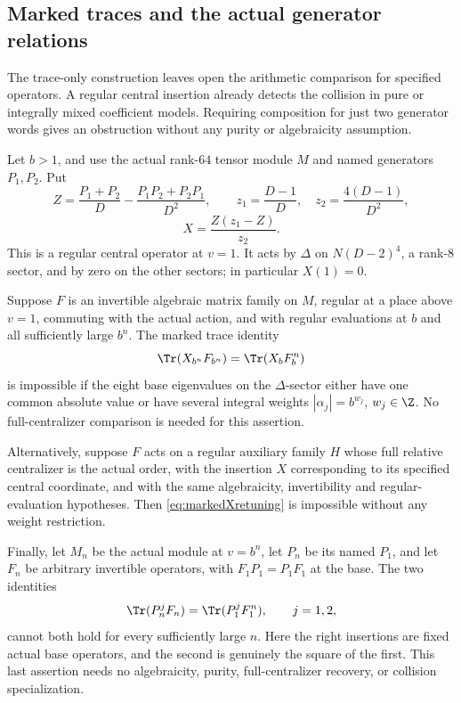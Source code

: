 \subsection{Marked traces and the actual generator relations}
The trace-only construction leaves open the arithmetic
comparison for specified operators. A regular central
insertion already detects the collision in pure or
integrally mixed coefficient models. Requiring composition
for just two generator words gives an obstruction without
any purity or algebraicity assumption.

\begin{finding}
\label{f:markedtracegates}
Let $b>1$, and use the actual rank-$64$ tensor module $M$
and named generators $P_1,P_2$.
Put
\[
 Z=\frac{P_1+P_2}{D}
       -\frac{P_1P_2+P_2P_1}{D^2},\qquad
 z_1=\frac{D-1}{D},\quad z_2=\frac{4(D-1)}{D^2},
\]
\begin{equation}\label{eq:actualmarkedX}
 X=\frac{Z(z_1-Z)}{z_2}.
\end{equation}
This is a regular central operator at $v=1$.
It acts by $\Delta$ on $N(D-2)^4$, a rank-$8$ sector,
and by zero on the other sectors; in particular $X(1)=0$.

Suppose $F$ is an invertible algebraic matrix family on $M$,
regular at a place above $v=1$, commuting with the actual
action, and with regular evaluations at $b$ and all
sufficiently large $b^n$.
The marked trace identity
\begin{equation}\label{eq:markedXretuning}
 \Tr(X_{b^n}F_{b^n})=\Tr(X_bF_b^n)
\end{equation}
is impossible if the eight base eigenvalues on the
$\Delta$-sector either have one common absolute value
or have several integral weights
$|\alpha_j|=b^{w_j}$, $w_j\in\Z$.
No full-centralizer comparison is needed for this assertion.

Alternatively, suppose $F$ acts on a regular auxiliary
family $H$ whose full relative centralizer is the actual
order, with the insertion $X$ corresponding to its
specified central coordinate, and with the same algebraicity,
invertibility and regular-evaluation hypotheses.
Then \eqref{eq:markedXretuning} is impossible without
any weight restriction.

Finally, let $M_n$ be the actual module at $v=b^n$, let
$P_n$ be its named $P_1$, and let $F_n$ be arbitrary
invertible operators, with $F_1P_1=P_1F_1$ at the base.
The two identities
\begin{equation}\label{eq:twowordretuning}
 \Tr(P_n^jF_n)=\Tr(P_1^jF_1^n),\qquad j=1,2,
\end{equation}
cannot both hold for every sufficiently large $n$.
Here the right insertions are fixed actual base operators,
and the second is genuinely the square of the first.
This last assertion needs no algebraicity, purity,
full-centralizer recovery, or collision specialization.
\end{finding}

